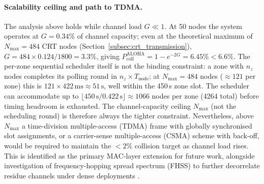 \documentclass[pdflatex,sn-mathphys-num]{sn-jnl}
\theoremstyle{thmstyleone}
\theoremstyle{thmstyletwo}
\theoremstyle{thmstylethree}
\begin{document}
\paragraph{Scalability ceiling and path to TDMA.}
The analysis above holds while channel load $G \ll 1$. At 50 nodes the system operates at $G = 0.34\%$ of channel capacity; even at the theoretical maximum of $N_{\max} = 484$ CRT nodes (Section~\ref{subsec:crt_transmission}), $G = 484 \times 0.124/1800 = 3.3\%$, giving $P_{\text{coll}}^{\text{ALOHA}} = 1 - e^{-2G} = 6.45\% < 6.6\%$. The per-zone sequential scheduler itself is not the binding constraint: a zone with $n_z$ nodes completes its polling round in $n_z \times T_{\text{node}}$; at $N_{\max} = 484$ nodes ($\approx 121$ per zone) this is $121 \times 422\,\text{ms} \approx 51\,\text{s}$, well within the 450\,s zone slot. The scheduler can accommodate up to $\lfloor 450\,\text{s} / 0.422\,\text{s} \rfloor \approx 1066$ nodes per zone (4264 total) before timing headroom is exhausted. The channel-capacity ceiling $N_{\max}$ (not the scheduling round) is therefore always the tighter constraint. Nevertheless, above $N_{\max}$ a time-division multiple-access (TDMA) frame with globally synchronised slot assignments, or a carrier-sense multiple-access (CSMA) scheme with back-off, would be required to maintain the $< 2\%$ collision target as channel load rises. This is identified as the primary MAC-layer extension for future work, alongside investigation of frequency-hopping spread spectrum (FHSS) to further decorrelate residue channels under dense deployments \cite{adelantado2017understanding,bor2016lorawan}.
\end{document}
